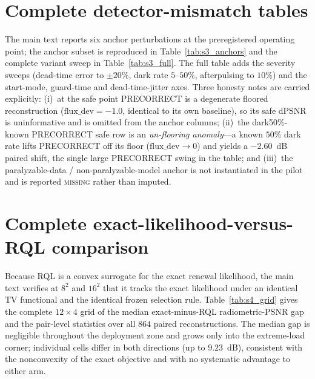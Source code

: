 \documentclass[10pt]{article}
\begin{document}
\section{Complete detector-mismatch tables}
\label{sec:s3}

The main text reports six anchor perturbations at the preregistered operating
point; the anchor subset is reproduced in Table~\ref{tab:s3_anchors} and the
complete variant sweep in Table~\ref{tab:s3_full}. The full table adds the
severity sweeps (dead-time error to $\pm20\%$, dark rate $5$--$50\%$,
afterpulsing to $10\%$) and the start-mode, guard-time and dead-time-jitter axes.
Three honesty notes are carried explicitly: (i)~at the safe point PRECORRECT is a
degenerate floored reconstruction ($\mathrm{flux\_dev}=-1.0$, identical to its
own baseline), so its safe dPSNR is uninformative and is omitted from the anchor
columns; (ii)~the dark50\%-known PRECORRECT safe row is an \emph{un-flooring
anomaly}---a known $50\%$ dark rate lifts PRECORRECT off its floor
($\mathrm{flux\_dev}\!\to\!0$) and yields a $-2.60$~dB paired shift, the single
large PRECORRECT swing in the table; and (iii)~the paralyzable-data /
non-paralyzable-model anchor is not instantiated in the pilot and is reported
\textsc{missing} rather than imputed.




\section{Complete exact-likelihood-versus-RQL comparison}
\label{sec:s4}

Because RQL is a convex surrogate for the exact renewal likelihood, the main text
verifies at $8^2$ and $16^2$ that it tracks the exact likelihood under an
identical TV functional and the identical frozen selection rule.
Table~\ref{tab:s4_grid} gives the complete $12\times4$ grid of the median
exact-minus-RQL radiometric-PSNR gap and the pair-level statistics over all $864$
paired reconstructions. The median gap is negligible throughout the deployment
zone and grows only into the extreme-load corner; individual cells differ in both
directions (up to $9.23$~dB), consistent with the nonconvexity of the exact
objective and with no systematic advantage to either arm.


\end{document}
